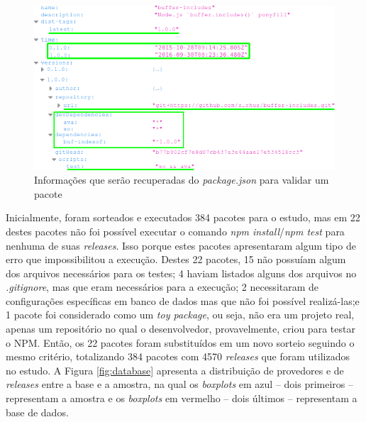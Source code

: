 \begin{figure}
    \centering
    \includegraphics[scale=0.7]{figuras/package_json.png}
    \caption{Informações que serão recuperadas do \textit{package.json} para validar um pacote}
    \label{fig:package_json}
\end{figure}{}

Inicialmente, foram sorteados e executados 384 pacotes para o estudo, mas em 22 destes pacotes não foi possível executar o comando \textit{npm install}/\textit{npm test} para nenhuma de suas \textit{releases}. Isso porque estes pacotes apresentaram algum tipo de erro que impossibilitou a execução. Destes 22 pacotes, 15 não possuíam algum dos arquivos necessários para os testes; 4 haviam listados alguns dos arquivos no \textit{.gitignore}, mas que eram necessários para a execução; 2 necessitaram de configurações específicas em banco de dados mas que não foi possível realizá-las;e 1 pacote foi considerado como um \textit{toy package}, ou seja, não era um projeto real, apenas um repositório no qual o desenvolvedor, provavelmente, criou para testar o \gls{NPM}. Então, os 22 pacotes foram substituídos em um novo sorteio seguindo o mesmo critério, totalizando 384 pacotes com 4570 \textit{releases} que foram utilizados no estudo. A Figura \ref{fig:database} apresenta a distribuição de provedores e de \textit{releases} entre a base e a amostra, na qual os \textit{boxplots} em azul -- dois primeiros -- representam a amostra e os \textit{boxplots} em vermelho -- dois últimos -- representam a base de dados.

